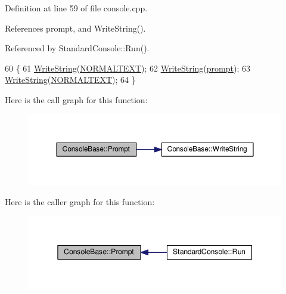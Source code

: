 Definition at line 59 of file console.\+cpp.



References prompt, and Write\+String().



Referenced by Standard\+Console\+::\+Run().


\begin{DoxyCode}
60 \{
61     \hyperlink{classConsoleBase_a839801eeb5c25cd0a2cb13523e387bed}{WriteString}(\hyperlink{platform_8h_abf175904907a69e0ce17289cdc282b59}{NORMALTEXT});
62     \hyperlink{classConsoleBase_a839801eeb5c25cd0a2cb13523e387bed}{WriteString}(\hyperlink{classConsoleBase_ac0b5764a1c339ac271d0c44943e4370c}{prompt});
63     \hyperlink{classConsoleBase_a839801eeb5c25cd0a2cb13523e387bed}{WriteString}(\hyperlink{platform_8h_abf175904907a69e0ce17289cdc282b59}{NORMALTEXT});
64 \}
\end{DoxyCode}


Here is the call graph for this function\+:
\nopagebreak
\begin{figure}[H]
\begin{center}
\leavevmode
\includegraphics[width=350pt]{d2/dbb/classConsoleBase_a79c5aa072ff3db35944a9825dcbfd9a7_cgraph}
\end{center}
\end{figure}




Here is the caller graph for this function\+:
\nopagebreak
\begin{figure}[H]
\begin{center}
\leavevmode
\includegraphics[width=345pt]{d2/dbb/classConsoleBase_a79c5aa072ff3db35944a9825dcbfd9a7_icgraph}
\end{center}
\end{figure}


